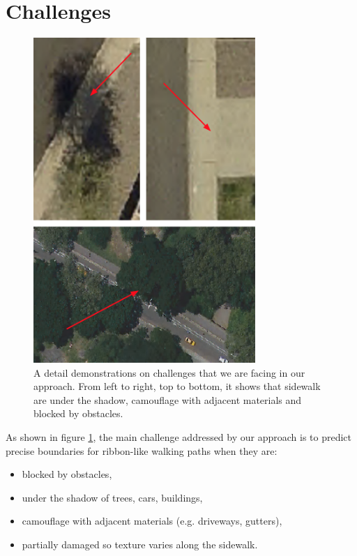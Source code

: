 \section{Challenges}

\begin{figure}[H]
    \centering
    \includegraphics[width=0.75\textwidth]{Figures/Challenge.png}
    \caption[Challenges Demonstration]{A detail demonstrations on challenges that we are facing in our approach. From left to right, top to bottom, it shows that sidewalk are under the shadow, camouflage with adjacent materials and blocked by obstacles.}
    \label{fig:challenge_demo}
\end{figure}

As shown in figure \ref{fig:challenge_demo}, the main challenge addressed by our approach is to predict precise boundaries for ribbon-like walking paths when they are:

\begin{itemize}
    \item blocked by obstacles,
    \item under the shadow of trees, cars, buildings,
    \item camouflage with adjacent materials (e.g. driveways, gutters),
    \item partially damaged so texture varies along the sidewalk.
\end{itemize}

